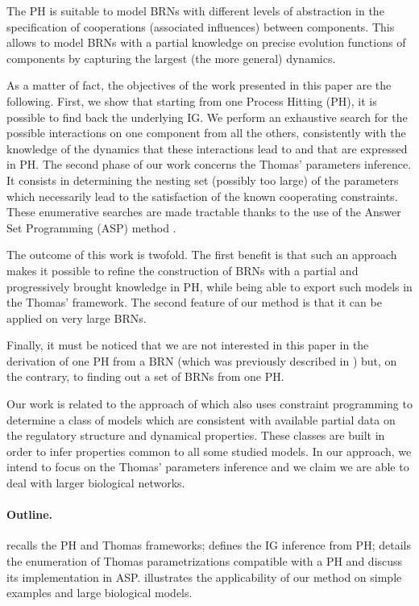 The PH is suitable to model BRNs with different levels of abstraction in the specification of
cooperations (associated influences) between components.
This allows to model BRNs with a partial knowledge on precise evolution functions of components
by capturing the largest (the more general) dynamics.

As a matter of fact, the objectives of the work presented in this paper are the following.
First, we show that starting from one Process Hitting (PH), it is possible to find
back the underlying IG.
We perform an exhaustive search for the possible interactions on one component from all the
others, consistently with the knowledge of the dynamics that these interactions lead to and that are
expressed in PH.
The second phase of our work concerns the Thomas' parameters inference.
It consists in determining the nesting set (possibly too large) of the parameters which necessarily lead to the satisfaction of the known cooperating constraints.
These enumerative searches are made tractable thanks to the use of the Answer Set Programming (ASP) method \cite{Baral03}.

The outcome of this work is twofold.
The first benefit is that such an approach makes it possible to refine the construction of
BRNs with a partial and progressively brought knowledge in PH, while being able to export such
models in the Thomas' framework.
The second feature of our method is that it can be applied on very large BRNs.

Finally, it must be noticed that we are not interested in this paper in the derivation of one
PH from a BRN (which was previously described in \cite{PMR10-TCSB}) but, on the contrary, to finding out
a set of BRNs from one PH.

Our work is related to the approach of \cite{20646302,DBLP:conf/ipcat/CorblinFTCT12} which also uses constraint programming to determine a class of models which are consistent with available partial data on the regulatory structure and dynamical properties.
These classes are built in order to infer properties common to all some studied models.
In our approach, we intend to focus on the Thomas' parameters inference and we claim we are able to deal with larger biological networks.

\paragraph{Outline.}
 recalls the PH and Thomas frameworks;
 defines the IG inference from PH;
 details the enumeration of Thomas parametrizations compatible with a PH
and discuss its implementation in ASP.
 illustrates the applicability of our method on simple examples
and large biological models.

